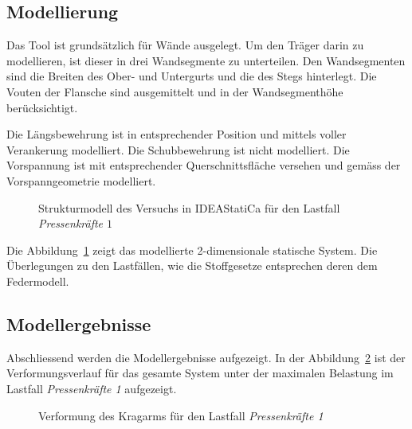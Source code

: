 \documentclass[
  11pt,
  letterpaper,
]{scrreprt}
\begin{document}
\subsection{Modellierung}\label{modellierung-3}

Das Tool ist grundsätzlich für Wände ausgelegt. Um den Träger darin zu
modellieren, ist dieser in drei Wandsegmente zu unterteilen. Den
Wandsegmenten sind die Breiten des Ober- und Untergurts und die des
Stegs hinterlegt. Die Vouten der Flansche sind ausgemittelt und in der
Wandsegmenthöhe berücksichtigt.

Die Längsbewehrung ist in entsprechender Position und mittels voller
Verankerung modelliert. Die Schubbewehrung ist nicht modelliert. Die
Vorspannung ist mit entsprechender Querschnittsfläche versehen und
gemäss der Vorspanngeometrie modelliert.

\begin{figure}[H]


\caption{\label{fig-system_ideastat}Strukturmodell des Versuchs in
IDEAStatiCa für den Lastfall \emph{Pressenkräfte \(1\)}}

\end{figure}%

Die Abbildung~\ref{fig-system_ideastat} zeigt das modellierte
2-dimensionale statische System. Die Überlegungen zu den Lastfällen, wie
die Stoffgesetze entsprechen deren dem Federmodell.

\subsection{Modellergebnisse}\label{modellergebnisse-3}

Abschliessend werden die Modellergebnisse aufgezeigt. In der
Abbildung~\ref{fig-def_kragarm_ideastat} ist der Verformungsverlauf für
das gesamte System unter der maximalen Belastung im Lastfall
\emph{Pressenkräfte 1} aufgezeigt.

\begin{figure}[H]


\caption{\label{fig-def_kragarm_ideastat}Verformung des Kragarms für den
Lastfall \emph{Pressenkräfte 1}}

\end{figure}%
\end{document}
